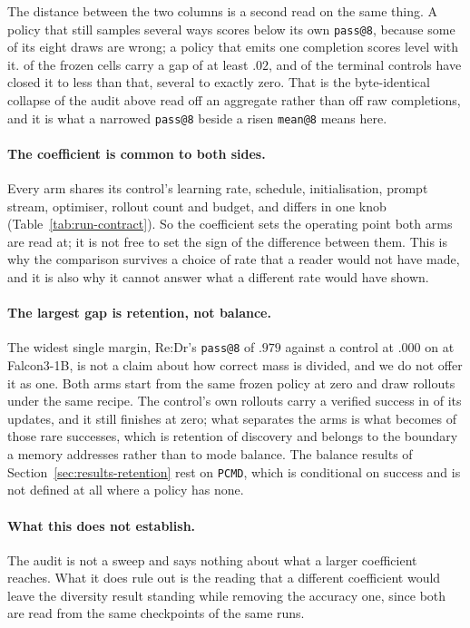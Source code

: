 \documentclass{article}
\newcommand{\1}{\mathbf 1}
\newcommand{\pmd}{\texttt{PCMD}}
\theoremstyle{remark}
\theoremstyle{definition}
\theoremstyle{plain}
\begin{document}
The distance between the two columns is a second read on the same thing. A
policy that still samples several ways scores below its own \texttt{pass@8},
because some of its eight draws are wrong; a policy that emits one completion
scores level with it. \MDctlOpened{} of the frozen cells carry a gap of at
least $.02$, and \MDctlClosed{} of the terminal controls have closed it to less
than that, several to exactly zero. That is the byte-identical collapse of the
audit above read off an aggregate rather than off raw completions, and it is
what a narrowed \texttt{pass@8} beside a risen \texttt{mean@8} means here.

\paragraph{The coefficient is common to both sides.}
Every arm shares its control's learning rate, schedule, initialisation, prompt
stream, optimiser, rollout count and budget, and differs in one knob
(Table~\ref{tab:run-contract}). So the coefficient sets the operating point
both arms are read at; it is not free to set the sign of the difference between
them. This is why the comparison survives a choice of rate that a reader would
not have made, and it is also why it cannot answer what a different rate would
have shown.

\paragraph{The largest gap is retention, not balance.}
The widest single margin, Re:Dr's \texttt{pass@8} of $.979$ against a control
at $.000$ on \MDctlZeroBaseDomain{} at Falcon3-1B, is not a claim about how
correct mass is divided, and we do not offer it as one. Both arms start from
the same frozen policy at zero and draw rollouts under the same recipe. The
control's own rollouts carry a verified success in \MDctlLeanestMixed{} of its
updates, and it still finishes at zero; what separates the arms is what becomes
of those rare successes, which is retention of discovery and belongs to the
boundary a memory addresses rather than to mode balance. The balance results of
Section~\ref{sec:results-retention} rest on \pmd{}, which is conditional on
success and is not defined at all where a policy has none.

\paragraph{What this does not establish.}
The audit is not a sweep and says nothing about what a larger coefficient
reaches. What it does rule out is the reading that a different coefficient
would leave the diversity result standing while removing the accuracy one, since
both are read from the same checkpoints of the same runs.
\end{document}
